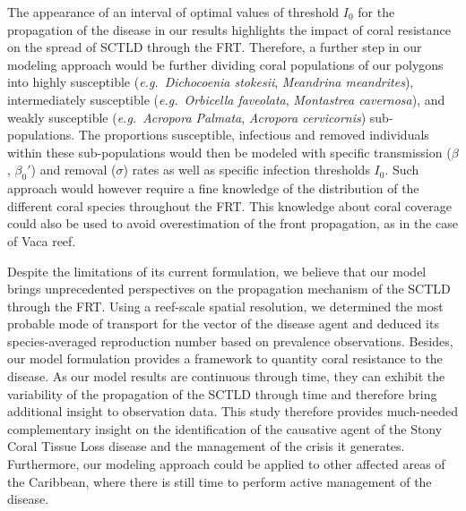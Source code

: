 \documentclass[utf8]{frontiersSCNS}
\newcommand{\eg}{{\it e.g.}\ }
\begin{document}
The appearance of an interval of optimal values of threshold $I_0$ for the propagation of the disease in our results highlights the impact of coral resistance on the spread of SCTLD through the FRT. Therefore, a further step in our modeling approach would be further dividing coral populations of our polygons into highly susceptible (\eg \textit{Dichocoenia stokesii}, \textit{Meandrina meandrites}), intermediately susceptible (\eg \textit{Orbicella faveolata}, \textit{Montastrea cavernosa}), and weakly susceptible (\eg \textit{Acropora Palmata}, \textit{Acropora cervicornis}) sub-populations. The proportions susceptible, infectious and removed individuals within these sub-populations would then be modeled with specific transmission ($\beta$, $\beta_0'$) and removal ($\sigma$) rates as well as specific infection thresholds $I_0$. Such approach would however require a fine knowledge of the distribution of the different coral species throughout the FRT. This knowledge about coral coverage could also be used to avoid overestimation of the front propagation, as in the case of Vaca reef.

Despite the limitations of its current formulation, we believe that our model brings unprecedented perspectives on the propagation mechanism of the SCTLD through the FRT. Using a reef-scale spatial resolution, we determined the most probable mode of transport for the vector of the disease agent and deduced its species-averaged reproduction number based on prevalence observations. Besides, our model formulation provides a framework to quantity coral resistance to the disease. As our model results are continuous through time, they can exhibit the variability of the propagation of the SCTLD through time and therefore bring additional insight to observation data. This study therefore provides much-needed complementary insight on the identification of the causative agent of the Stony Coral Tissue Loss disease and the management of the crisis it generates. Furthermore, our modeling approach could be applied to other affected areas of the Caribbean, where there is still time to perform active management of the disease.

% 
\end{document}
